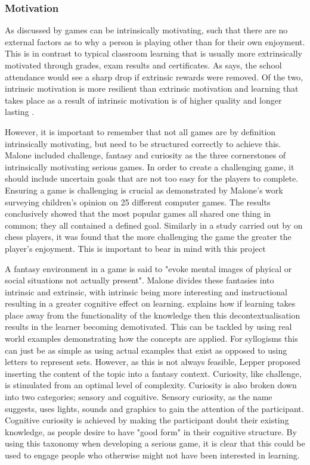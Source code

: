 \documentclass[12pt,a4paper]{report}
\begin{document}
\subsubsection{Motivation}
As discussed by \cite{malone1981toward} games can be intrinsically motivating, such that there are no external factors as to why a person is playing other than for their own enjoyment. This is in contrast to typical classroom learning that is usually more extrinsically motivated through grades, exam results and certificates. As  \cite{csikszentmihalyi1997talented} says, the school attendance would see a sharp drop if extrinsic rewards were removed. Of the two, intrinsic motivation is more resilient than extrinsic motivation and learning that takes place as a result of intrinsic motivation is of higher quality and longer lasting \citep{kawachi2003initiating}.

However, it is important to remember that not all games are by definition intrinsically motivating, but need to be structured correctly to achieve this. Malone included challenge, fantasy and curiosity as the three cornerstones of intrinsically motivating serious games.  
In order to create a challenging game, it should include uncertain goals that are not too easy for the players to complete. Ensuring a game is challenging is crucial as demonstrated by Malone's work surveying children's opinion on 25 different computer games. The results conclusively showed that the most popular games all shared one thing in common; they all contained a defined goal.  Similarly in a study carried out by \cite{abuhamdeh2012importance} on chess players, it was found that the more challenging the game the greater the player's enjoyment. This is important to bear in mind with this project %

A fantasy environment in a game is said to "evoke mental images of phyical or social situations not actually present". Malone divides these fantasies into intrinsic and extrinsic, with intrinsic being more interesting and instructional resulting in a  greater cognitive effect on learning. \cite{lepper1988motivational} explains how if learning takes place away from the functionality of the knowledge then this decontextualisation results in the learner becoming demotivated.  This can be tackled by using real world examples demonstrating how the concepts are applied. For syllogisms this can just be as simple as using actual examples that exist as opposed to using letters to represent sets. However, as this is not always feasible, Lepper proposed inserting the content of the topic into a fantasy context.
Curiosity, like challenge, is stimulated from an optimal level of complexity. Curiosity is also broken down into two categories; sensory and cognitive.  Sensory curiosity, as the name suggests, uses lights, sounds and graphics to gain the attention of the participant. Cognitive curiosity is achieved by making the participant doubt their existing knowledge, as people desire to have "good form" in their cognitive structure.   By using this taxonomy when developing a serious game, it is clear that this could be used to engage people who otherwise might not have been interested in learning. 
\end{document}
